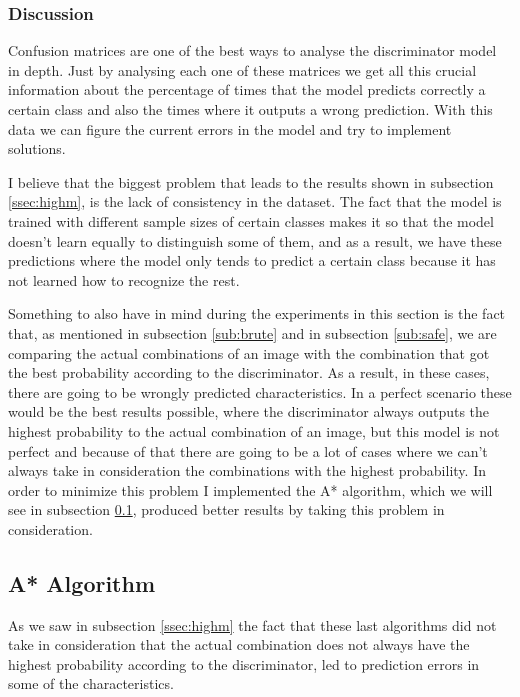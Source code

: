 \documentclass[12pt,a4paper,oneside]{memoir}
\begin{document}
\subsubsection{Discussion}
Confusion matrices are one of the best ways to analyse the discriminator model in depth. Just by analysing each one of these matrices we get all this crucial information about the percentage of times that the model predicts correctly a certain class and also the times where it outputs a wrong prediction. With this data we can figure the current errors in the model and try to implement solutions.




\par

I believe that the biggest problem that leads to the results shown in subsection \ref{ssec:highm}, is the lack of consistency in the dataset. The fact that the model is trained with different sample sizes of certain classes makes it so that the model doesn't learn equally to distinguish some of them, and as a result, we have these predictions where the model only tends to predict a certain class because it has not learned how to recognize the rest.


\par

Something to also have in mind during the experiments in this section is the fact that, as mentioned in subsection \ref{sub:brute} and in subsection \ref{sub:safe}, we are comparing the actual combinations of an image with the combination that got the best probability according to the discriminator. As a result, in these cases, there are going to be wrongly predicted characteristics. In a perfect scenario these would be the best results possible, where the discriminator always outputs the highest probability to the actual combination of an image, but this model is not perfect and because of that there are going to be a lot of cases where we can't always take in consideration the combinations with the highest probability. In order to minimize this problem I implemented the A* algorithm, which we will see in subsection \ref{ss:astar}, produced better results by taking this problem in consideration.


\subsection{A* Algorithm}
\label{ss:astar}
As we saw in subsection \ref{ssec:highm} the fact that these last algorithms did not take in consideration that the actual combination does not always have the highest probability according to the discriminator, led to prediction errors in some of the characteristics.  
\end{document}
